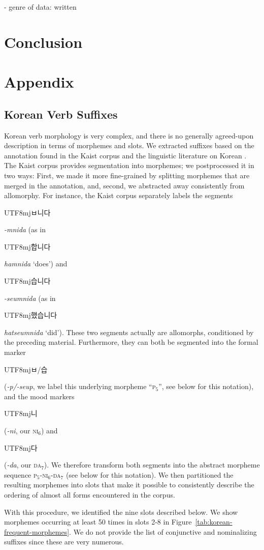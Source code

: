 \documentclass[11pt,letterpaper]{article}
\newcommand{\korean}[1]{\begin{CJK}{UTF8}{mj}#1\end{CJK}}
\begin{document}
- genre of data: written



\section{Conclusion}



\appendix

\section{Appendix}



\subsection{Korean Verb Suffixes}

Korean verb morphology is very complex, and there is no generally agreed-upon description in terms of morphemes and slots.
We extracted suffixes based on the annotation found in the Kaist corpus and the linguistic literature on Korean \citep{yeon2010korean}.
The Kaist corpus provides segmentation into morphemes; we postprocessed it in two ways:
First, we made it more fine-grained by splitting morphemes that are merged in the annotation, and, second, we abstracted away consistently from allomorphy.
For instance, the Kaist corpus separately labels the segments \korean{ㅂ니다} \textit{-mnida} (as in \korean{합니다} \textit{hamnida} `does') and \korean{습니다} \textit{-seumnida} (as in \korean{했습니다} \textit{hatseumnida} `did').
These two segments actually are allomorphs, conditioned by the preceding material.
Furthermore, they can both be segmented into the formal marker \korean{ㅂ/습} (\textit{-p/-seup}, we label this underlying morpheme ``\textsc{p}$_5$'', see below for this notation), and the mood markers \korean{니} (\textit{-ni}, our \textsc{ni}$_6$) and \korean{다} (\textit{-da}, our \textsc{da}$_7$).
We therefore transform both segments into the abstract morpheme sequence \textsc{p}$_5$-\textsc{ni}$_6$-\textsc{da}$_7$ (see below for this notation).
We then partitioned the resulting morphemes into slots that make it possible to consistently describe the ordering of almost all forms encountered in the corpus.


With this procedure, we identified the nine slots described below. We show morphemes occurring at least 50 times in slots 2-8 in Figure~\ref{tab:korean-frequent-morphemes}.
We do not provide the list of conjunctive and nominalizing suffixes since these are very numerous.
\end{document}
